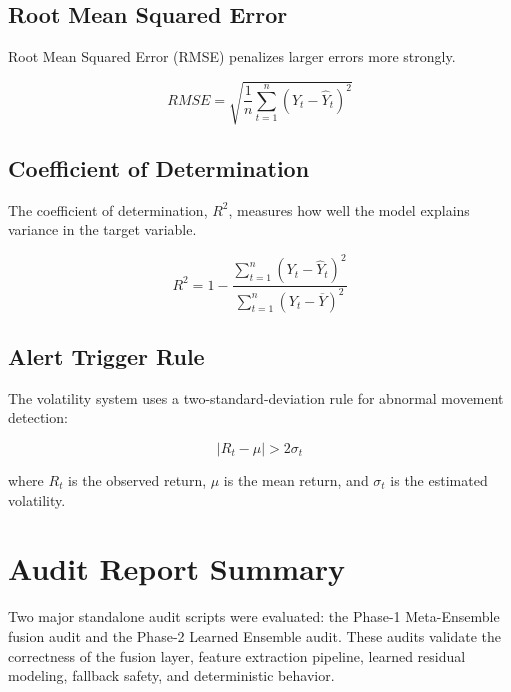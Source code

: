 \documentclass[12pt,a4paper]{report}
\begin{document}
\subsection{Root Mean Squared Error}

Root Mean Squared Error (RMSE) penalizes larger errors more strongly.

\begin{equation}
RMSE = \sqrt{
\frac{1}{n} \sum_{t=1}^{n} (Y_t - \hat{Y}_t)^2
}
\end{equation}

\subsection{Coefficient of Determination}

The coefficient of determination, $R^2$, measures how well the model explains variance in the target variable.

\begin{equation}
R^2 = 1 - \frac{\sum_{t=1}^{n}(Y_t - \hat{Y}_t)^2}
{\sum_{t=1}^{n}(Y_t - \overline{Y})^2}
\end{equation}

\subsection{Alert Trigger Rule}

The volatility system uses a two-standard-deviation rule for abnormal movement detection:

\begin{equation}
|R_t - \mu| > 2\sigma_t
\end{equation}

where $R_t$ is the observed return, $\mu$ is the mean return, and $\sigma_t$ is the estimated volatility.

\section{Audit Report Summary}

Two major standalone audit scripts were evaluated: the Phase-1 Meta-Ensemble fusion audit and the Phase-2 Learned Ensemble audit. These audits validate the correctness of the fusion layer, feature extraction pipeline, learned residual modeling, fallback safety, and deterministic behavior.
\end{document}
